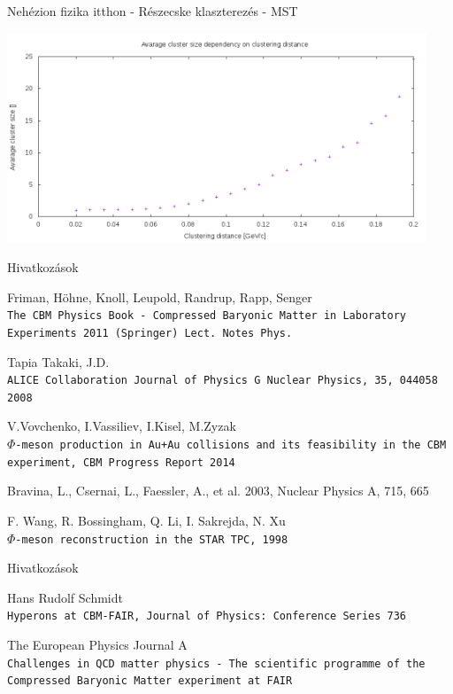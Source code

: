 \documentclass[10pt]{beamer}
\begin{document}
\begin{frame}[t]{Nehézion fizika itthon - Részecske klaszterezés - MST}
\begin{minipage}{0.45\textwidth}
\centering
\includegraphics[width=0.94\textwidth]{../latex/momdist-mean.png}
\end{minipage}
\end{frame}

\begin{frame}[t]{Hivatkozások}
\begin{thebibliography}{9}
	Friman, Höhne, Knoll, Leupold, Randrup, Rapp, Senger
	\\\texttt{The CBM Physics Book - Compressed Baryonic Matter in Laboratory Experiments 2011 (Springer) Lect. Notes Phys.}
				
	 Tapia Takaki, J.D.
	 \\\texttt{ALICE Collaboration Journal of Physics G Nuclear Physics, 35, 044058 2008}
				
	 V.Vovchenko, I.Vassiliev, I.Kisel, M.Zyzak
	 \\\texttt{$\Phi$-meson production in Au+Au collisions and its feasibility in the CBM experiment, CBM Progress Report 2014}
				
	Bravina, L., Csernai, L., Faessler, A., et al. 2003, Nuclear Physics A, 715, 665 
				
	F. Wang, R. Bossingham, Q. Li, I. Sakrejda,  N. Xu 
	\\\texttt{$\Phi$-meson reconstruction in the STAR TPC, 1998}
\end{thebibliography}
\end{frame}

\begin{frame}[t]{Hivatkozások}
\begin{thebibliography}{9}
	Hans Rudolf Schmidt
	\\\texttt{Hyperons at CBM-FAIR, Journal of Physics: Conference Series 736}
	
	The European Physics Journal A
	\\\texttt{Challenges in QCD matter physics - The scientific programme of the Compressed Baryonic Matter experiment at FAIR}
\end{thebibliography}
\end{frame}
\end{document}
